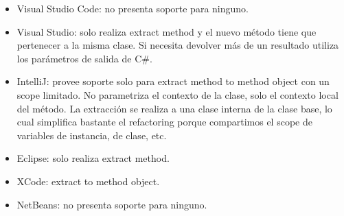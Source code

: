 \begin{itemize}
    \item Visual Studio Code: no presenta soporte para ninguno.
    \item Visual Studio: solo realiza extract method y el nuevo método tiene que pertenecer a la
misma clase. Si necesita devolver más de un resultado utiliza los parámetros de salida de C\#.
    \item IntelliJ: provee soporte solo para extract method to method object con un scope limitado.
    No parametriza el contexto de la clase, solo el contexto local del método. La extracción se realiza a una clase 
    interna de la clase base, lo cual simplifica bastante el refactoring porque compartimos el scope de
    variables de instancia, de clase, etc.
    \item Eclipse: solo realiza extract method.
    \item XCode: extract to method object.
    \item NetBeans: no presenta soporte para ninguno.
\end{itemize}
